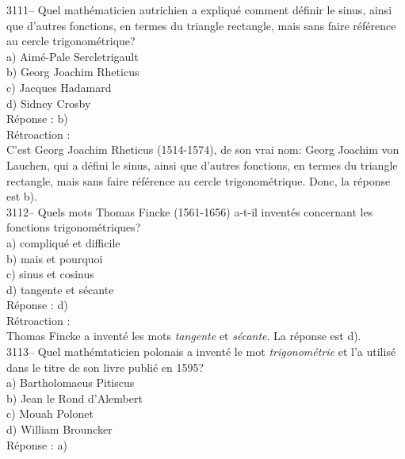 \documentclass[letterpaper, 12pt]{article}
\begin{document}
3111-- Quel math\'ematicien autrichien a expliqu\'e comment d\'efinir le sinus, ainsi que d'autres fonctions, en termes du triangle rectangle, mais sans faire r\'ef\'erence au cercle trigonom\'etrique?\\

a) Aim\'e-Pale Sercletrigault\\
b) Georg Joachim Rheticus\\
c) Jacques Hadamard\\
d) Sidney Crosby\\

R\'eponse : b)\\

R\'etroaction :\\
C'est Georg Joachim Rheticus (1514-1574), de son vrai nom: Georg Joachim von Lauchen, qui a d\'efini le sinus, ainsi que d'autres fonctions, en termes du triangle rectangle, mais sans faire r\'ef\'erence au cercle trigonom\'etrique. Donc, la r\'eponse est b).\\



3112-- Quels mots Thomas Fincke (1561-1656) a-t-il invent\'es concernant les fonctions trigonom\'etriques?\\

a) compliqu\'e et difficile\\
b) mais et pourquoi\\
c) sinus et cosinus\\
d) tangente et s\'ecante\\

R\'eponse : d)\\

R\'etroaction :\\
Thomas Fincke a invent\'e les mots \emph{tangente} et \emph{s\'ecante}. La r\'eponse est d).\\



3113-- Quel math\'emtaticien polonais a invent\'e le mot \emph{trigonom\'etrie} et l'a utilis\'e dans le titre de son livre publi\'e en 1595?\\

a) Bartholomaeus Pitiscus\\
b) Jean le Rond d'Alembert\\
c) Mouah Polonet\\
d) William Brouncker\\

R\'eponse : a)\\
\end{document}
